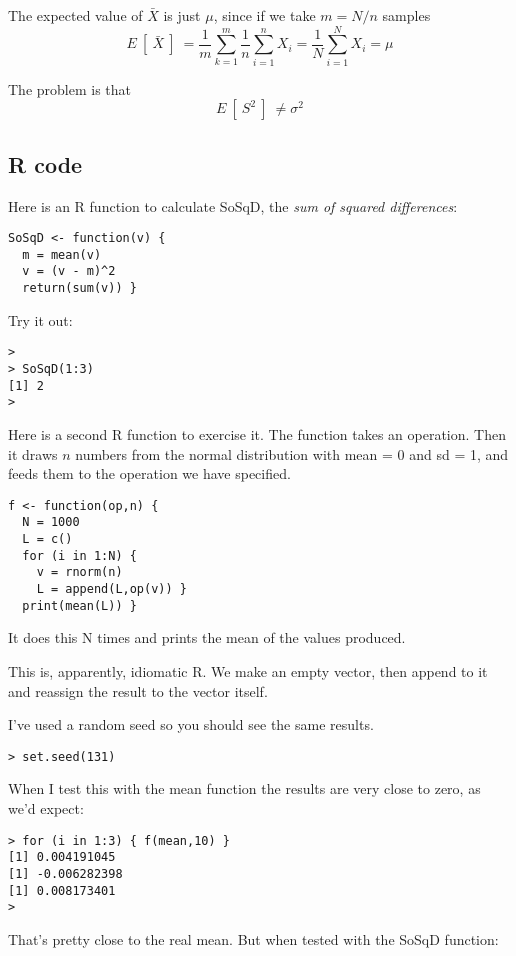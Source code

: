 \documentclass[11pt, oneside]{article}
\begin{document}
The expected value of $\bar{X}$ is just $\mu$, since if we take $m = N/n$ samples
\[ E \ [ \ \bar{X} \ ] \ = \frac{1}{m} \sum_{k=1}^{m} \frac{1}{n} \sum_{i=1}^{n} X_i = \frac{1}{N} \sum_{i=1}^{N} X_i = \mu \]

The problem is that 
\[ E \ [ \ S^2 \ ] \ \ne \sigma^2 \]

\subsection*{R code}

Here is an R function to calculate SoSqD, the \emph{sum of squared differences}:

\begin{verbatim}
SoSqD <- function(v) {
  m = mean(v)
  v = (v - m)^2
  return(sum(v)) }
\end{verbatim}

Try it out:

\begin{verbatim}
> 
> SoSqD(1:3)
[1] 2
>
\end{verbatim}

Here is a second R function to exercise it.  The function takes an operation.  Then it draws $n$ numbers from the normal distribution with mean = 0 and sd = 1, and feeds them to the operation we have specified.

\begin{verbatim}
f <- function(op,n) {
  N = 1000
  L = c()
  for (i in 1:N) {
    v = rnorm(n)
    L = append(L,op(v)) }
  print(mean(L)) }
\end{verbatim}

It does this N times and prints the mean of the values produced.

This is, apparently, idiomatic R.  We make an empty vector, then append to it and reassign the result to the vector itself.

I've used a random seed so you should see the same results.

\begin{verbatim}
> set.seed(131)
\end{verbatim}

When I test this with the mean function the results are very close to zero, as we'd expect:

\begin{verbatim}
> for (i in 1:3) { f(mean,10) }
[1] 0.004191045
[1] -0.006282398
[1] 0.008173401
>
\end{verbatim}

That's pretty close to the real mean.  But when tested with the SoSqD function:
\end{document}
